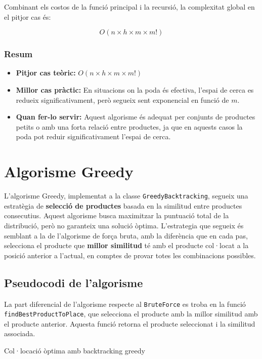 \documentclass[a4paper,12pt]{report}
\begin{document}
\begin{itemize}
Combinant els costos de la funció principal i la recursió, la complexitat global en el pitjor cas és:

\[
O(n \times h \times m \times m!)
\]

\subsubsection{Resum}

\begin{itemize}
    \item \textbf{Pitjor cas teòric:} \(O(n \times h \times m \times m!)\)
    \item \textbf{Millor cas pràctic:} En situacions on la poda és efectiva, l'espai de cerca es redueix significativament, però segueix sent exponencial en funció de \(m\).
    \item \textbf{Quan fer-lo servir:} Aquest algorisme és adequat per conjunts de productes petits o amb una forta relació entre productes, ja que en aquests casos la poda pot reduir significativament l'espai de cerca.
\end{itemize}


\section{Algorisme Greedy}

L'algorisme Greedy, implementat a la classe \texttt{GreedyBacktracking}, segueix una estratègia de \textbf{selecció de productes} basada en la similitud entre productes consecutius. Aquest algorisme busca maximitzar la puntuació total de la distribució, però no garanteix una solució òptima.
\newline
L'estrategia que segueix és semblant a la de l'algorisme de força bruta, amb la diferència que en cada pas, selecciona el producte que \textbf{millor similitud} té amb el producte col·locat a la posició anterior a l'actual, en comptes de provar totes les combinacions possibles.

\subsection{Pseudocodi de l'algorisme}

La part diferencial de l'algorisme respecte al \texttt{BruteForce} es troba en la funció \texttt{findBestProductToPlace}, que selecciona el producte amb la millor similitud amb el producte anterior. 
Aquesta funció retorna el producte seleccionat i la similitud associada.
\newline
\begin{algorithm}[H]
	\SetAlgoVlined
	\caption{Col·locació òptima amb backtracking greedy}
\end{algorithm}


\end{itemize}
\end{document}
